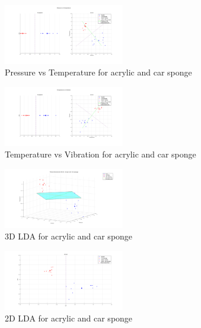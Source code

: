 \documentclass[10pt,twocolumn,letterpaper]{article}
\begin{document}
\begin{figure}[h]
\begin{center}
   \includegraphics[width=0.47\textwidth]{sec3_part1d_2}
\end{center}
   \caption{Pressure vs Temperature for acrylic and car sponge}
\label{fig:24}
\end{figure}

\begin{figure}[h]
\begin{center}
   \includegraphics[width=0.47\textwidth]{sec3_part1d_3}
\end{center}
   \caption{Temperature vs Vibration for acrylic and car sponge}
\label{fig:25}
\end{figure}

\begin{figure}[h]
\begin{center}
   \includegraphics[width=0.47\textwidth]{sec3_part1d_4}
\end{center}
   \caption{3D LDA for acrylic and car sponge}
\label{fig:26}
\end{figure}

\begin{figure}[h]
\begin{center}
   \includegraphics[width=0.47\textwidth]{sec3_part1d_5}
\end{center}
   \caption{2D LDA for acrylic and car sponge}
\label{fig:27}
\end{figure}
\end{document}
